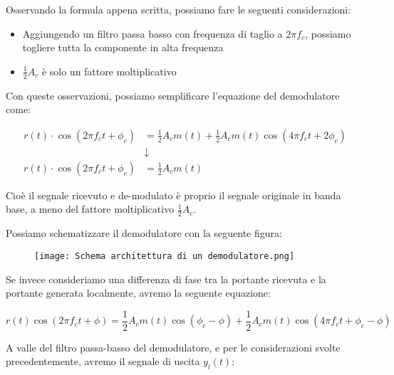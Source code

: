 Osservando la formula appena scritta, possiamo fare le seguenti considerazioni: 

\begin{itemize}
    \item Aggiungendo un filtro passa basso con frequenza di taglio a $2 \pi f_c$, possiamo togliere tutta la componente in alta frequenza 
    \item $\frac{1}{2} A_c$ è solo un fattore moltiplicativo
\end{itemize}

Con queste osservazioni, possiamo semplificare l'equazione del demodulatore come: 

{
    \Large 
    \begin{equation}
        \begin{split}
        r(t) \cdot \cos(2 \pi f_c t + \phi_c) 
        &=
        \frac{1}{2} A_c m(t)
        +
        \frac{1}{2} A_c m(t)
        \cos(4 \pi f_c t + 2 \phi_c)  
        \\
        &\downarrow
        \\
        r(t) \cdot \cos(2 \pi f_c t + \phi_c)
        &= 
        \frac{1}{2} A_c m(t)
        \end{split}
    \end{equation}
}

Cioè il segnale ricevuto e de-modulato è proprio il segnale originale in banda base, a meno del fattore moltiplicativo $\frac{1}{2} A_c$. \newline 

Possiamo schematizzare il demodulatore con la seguente figura: 

\begin{figure}[h]
    \centering
    \texttt{[image: Schema architettura di un demodulatore.png]}
\end{figure} 

Se invece consideriamo una differenza di fase tra la portante ricevuta e la portante generata localmente, 
avremo la seguente equazione: 

{
    \Large 
    \begin{equation}
            r(t) \cos(2 \pi f_c t + \phi)
            = 
            \frac{1}{2} A_c m(t) \cos(\phi_c - \phi)
            + 
            \frac{1}{2} A_c m(t) \cos(4 \pi f_c t + \phi_c - \phi)
    \end{equation}
}

A valle del filtro passa-basso del demodulatore, e per le considerazioni svolte precedentemente, avremo il segnale di uscita $y_l (t)$:

